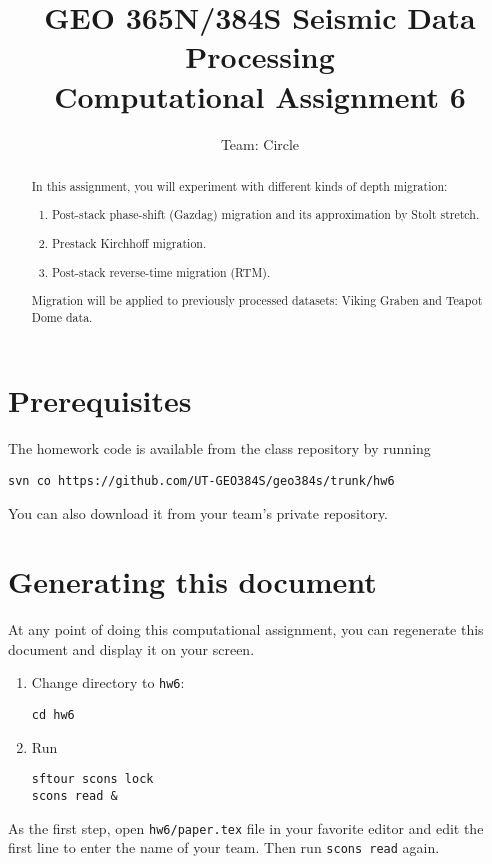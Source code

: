 \author{Team: Circle}
\title{GEO 365N/384S Seismic Data Processing \\ Computational Assignment 6}

\begin{abstract}
In this assignment, you will experiment with different kinds of depth migration:
  \begin{enumerate}
  \item Post-stack phase-shift (Gazdag) migration and its approximation by Stolt stretch.
  \item Prestack Kirchhoff migration.
  \item Post-stack reverse-time migration (RTM).
  \end{enumerate}
Migration will be applied to previously processed datasets: Viking Graben and Teapot Dome data.
\end{abstract}

\section{Prerequisites}

The homework code is available from the class repository
by running
\begin{verbatim}
svn co https://github.com/UT-GEO384S/geo384s/trunk/hw6
\end{verbatim}
You can also download it from your team's private repository.

\section{Generating this document}

At any point of doing this computational assignment, you can
regenerate this document and display it on your screen.

\begin{enumerate}          
\item Change directory to \texttt{hw6}:
\begin{verbatim}
cd hw6
\end{verbatim}
\item Run
\begin{verbatim}
sftour scons lock
scons read &
\end{verbatim}
\end{enumerate}

As the first step, open \texttt{hw6/paper.tex} file in your favorite
editor and edit the first line to enter the name of your team. Then
run \texttt{scons read} again.

